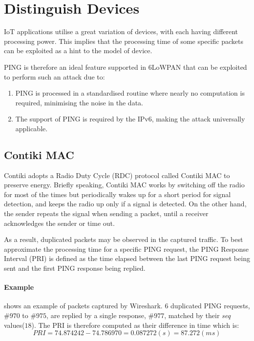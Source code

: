 \section{Distinguish Devices}
IoT applications utilise a great variation of devices, with each having different processing power. This implies that the processing time of some specific packets can be exploited as a hint to the model of device. 

PING is therefore an ideal feature supported in 6LoWPAN that can be exploited to perform such an attack due to:
\begin{enumerate}
	\item PING is processed in a standardised routine where nearly no computation is required, minimising the noise in the data.
	\item The support of PING is required by the IPv6\cite{rfc4443}, making the attack universally applicable.
\end{enumerate}

\subsection{Contiki MAC}\label{TimingWithContikiMAC}
Contiki adopts a Radio Duty Cycle (RDC) protocol called Contiki MAC\cite{ContikiMAC} to preserve energy. Briefly speaking, Contiki MAC works by switching off the radio for most of the times but periodically wakes up for a short period for signal detection, and keeps the radio up only if a signal is detected. On the other hand, the sender repeats the signal when sending a packet, until a receiver acknowledges the sender or time out.

As a result, duplicated packets may be observed in the captured traffic. To best approximate the processing time for a specific PING request, the PING Response Interval (PRI) is defined as the time elapsed between the last PING request being sent and the first PING response being replied. 

\paragraph{Example}
 shows an example of packets captured by Wireshark\cite{Wireshark}. 6 duplicated PING requests, \#$970$ to \#$975$, are replied by a single response, \#$977$, matched by their \textit{seq} values($18$). The PRI is therefore computed as their difference in time which is:
\begin{equation*}
PRI = 74.874242 - 74.786970 = 0.087272(s) = 87.272(ms)
\end{equation*}

